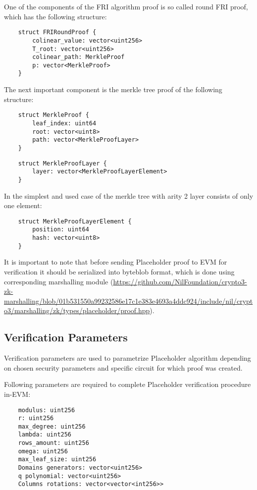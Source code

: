 One of the components of the FRI algorithm proof is so called round FRI proof, which has the following structure:

\begin{verbatim}
    struct FRIRoundProof {
        colinear_value: vector<uint256>
        T_root: vector<uint256>
        colinear_path: MerkleProof
        p: vector<MerkleProof>
    }
\end{verbatim}

The next important component is the merkle tree proof of the following structure:

\begin{verbatim}
    struct MerkleProof {
        leaf_index: uint64
        root: vector<uint8>
        path: vector<MerkleProofLayer>
    }
\end{verbatim}

\begin{verbatim}
    struct MerkleProofLayer {
        layer: vector<MerkleProofLayerElement>
    }       
\end{verbatim}

In the simplest and used case of the merkle tree with arity 2 layer consists of only one element:

\begin{verbatim}
    struct MerkleProofLayerElement {
        position: uint64
        hash: vector<uint8>
    }
\end{verbatim}

It is important to note that before sending Placeholder proof to EVM for verification it should be serialized into byteblob format,
which is done using corresponding marshalling module 
(\url{https://github.com/NilFoundation/crypto3-zk-marshalling/blob/01b531550a99232586e17c1e383e4693a4ddc924/include/nil/crypto3/marshalling/zk/types/placeholder/proof.hpp}).

\subsection{Verification Parameters}

Verification parameters are used to parametrize Placeholder algorithm depending on chosen security parameters and specific circuit for which proof was created.

Following parameters are required to complete Placeholder verification procedure in-EVM:
\begin{verbatim}
    modulus: uint256
    r: uint256
    max_degree: uint256
    lambda: uint256
    rows_amount: uint256
    omega: uint256
    max_leaf_size: uint256
    Domains generators: vector<uint256>
    q polynomial: vector<uint256>
    Columns rotations: vector<vector<int256>>
\end{verbatim}
